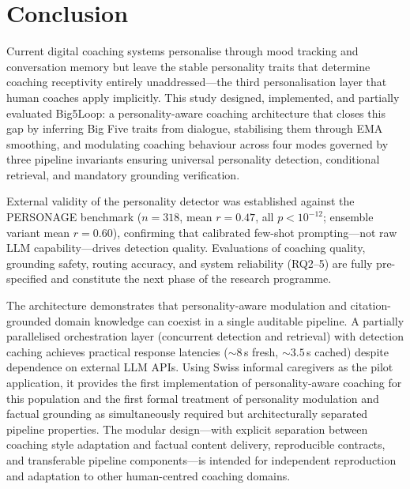 \documentclass[10pt,a4paper]{report}
\begin{document}
\chapter{Conclusion}
\label{ch:conclusion}

Current digital coaching systems personalise through mood tracking and conversation memory but leave the stable personality traits that determine coaching receptivity entirely unaddressed---the third personalisation layer that human coaches apply implicitly. This study designed, implemented, and partially evaluated Big5Loop: a personality-aware coaching architecture that closes this gap by inferring Big Five traits from dialogue, stabilising them through EMA smoothing, and modulating coaching behaviour across four modes governed by three pipeline invariants ensuring universal personality detection, conditional retrieval, and mandatory grounding verification.

External validity of the personality detector was established against the PERSONAGE benchmark ($n = 318$, mean $r = 0.47$, all $p < 10^{-12}$; ensemble variant mean $r = 0.60$), confirming that calibrated few-shot prompting---not raw LLM capability---drives detection quality. Evaluations of coaching quality, grounding safety, routing accuracy, and system reliability (RQ2--5) are fully pre-specified and constitute the next phase of the research programme.

The architecture demonstrates that personality-aware modulation and citation-grounded domain knowledge can coexist in a single auditable pipeline. A partially parallelised orchestration layer (concurrent detection and retrieval) with detection caching achieves practical response latencies (${\sim}8$\,s fresh, ${\sim}3.5$\,s cached) despite dependence on external LLM APIs. Using Swiss informal caregivers as the pilot application, it provides the first implementation of personality-aware coaching for this population and the first formal treatment of personality modulation and factual grounding as simultaneously required but architecturally separated pipeline properties. The modular design---with explicit separation between coaching style adaptation and factual content delivery, reproducible contracts, and transferable pipeline components---is intended for independent reproduction and adaptation to other human-centred coaching domains.



\end{document}
